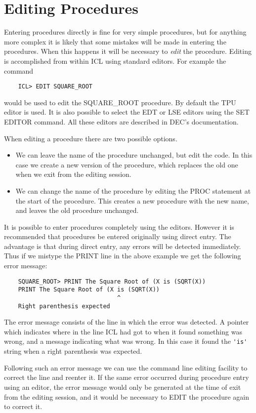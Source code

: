 \documentclass[twoside,11pt]{report}
\newcommand{\xlabel}[1]{}
\begin{document}
\section{\xlabel{editing_procedures}Editing Procedures}
Entering procedures directly is fine for very simple procedures, but for
anything more complex it is likely that some mistakes will be made in
entering the procedures. When this happens it will be necessary to 
{\em edit} the procedure. Editing is accomplished from within ICL using
standard editors. 
For example the command
\begin{verbatim}
    ICL> EDIT SQUARE_ROOT
\end{verbatim}
would be used to edit the SQUARE\_ROOT procedure. By default the TPU editor
is used. It is also possible to select the EDT or LSE editors using the 
SET EDITOR command. All these editors are described in DEC's documentation.

When editing a procedure there are two possible options.
\begin{itemize}
\item We can leave the name of the procedure unchanged, but edit the code. In
this case we create a new version of the procedure, which replaces the old
one when we exit from the editing session.
\item We can change the name of the procedure by editing the PROC statement
at the start of the procedure. This creates a new procedure with the
new name, and leaves the old procedure unchanged.
\end{itemize}

It is possible to enter procedures completely using the editors. However
it is recommended that procedures be entered originally using direct entry.
The advantage is that during direct entry, any errors will be detected immediately.
Thus if we mistype the PRINT line in the above example we get the following
error message:
\begin{verbatim}
    SQUARE_ROOT> PRINT The Square Root of (X is (SQRT(X))
    PRINT The Square Root of (X is (SQRT(X))
                                ^
    Right parenthesis expected
\end{verbatim}
The error message consists of the line in which the error was detected. A
pointer which indicates where in the line ICL had got to when it found
something was wrong, and a message indicating what was wrong. In this case
it found the \verb+'is'+ string when a right parenthesis was expected.

Following such an error message we can use the command line editing facility
to correct the line and reenter it. If the same error occurred during
procedure entry using an editor, the error message would only be generated
at the time of exit from the editing session, and it would be necessary to 
EDIT the procedure again to correct it.
\end{document}
